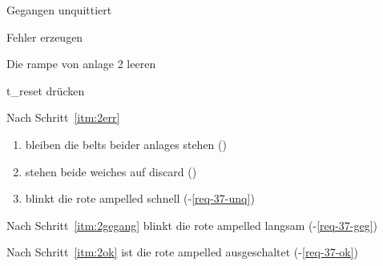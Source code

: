 \begin{ablauf}{Gegangen unquittiert}
    \item \label{itm:2err} Fehler erzeugen
    \item\label{itm:2gegang} Die \gls{rampe} von \gls{anlage} 2 leeren
    \item\label{itm:2ok} \gls{t_reset} drücken
\end{ablauf}
\begin{erwartung}
    \item Nach Schritt~\ref{itm:2err}
    \begin{enumerate}
        \item bleiben die \glspl{belt} beider \glspl{anlage} stehen ()
        \item stehen beide \glspl{weiche} auf \gls{discard} ()
        \item blinkt die rote \gls{ampelled} schnell (-\ref{req-37-unq})
    \end{enumerate}
    \item Nach Schritt~\ref{itm:2gegang} blinkt die rote \gls{ampelled} langsam (-\ref{req-37-geg})
    \item Nach Schritt~\ref{itm:2ok} ist die rote \gls{ampelled} ausgeschaltet (-\ref{req-37-ok})
\end{erwartung}

